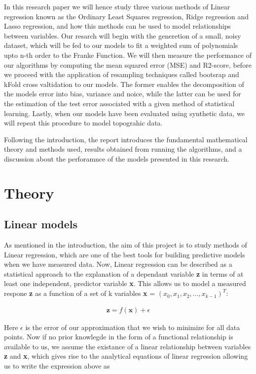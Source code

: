 \documentclass[a4paper, 10pt]{article}
\begin{document}
In this research paper we will hence study three various methods of Linear regression known as the Ordinary Least Squares regression, Ridge regression and Lasso regression, and how this methods can be used to model relationships between variables. Our resarch will begin with the generetion of a small, noisy dataset, which will be fed to our models to fit a weighted sum of polynomials upto n-th order to the Franke Function. We will then measure the performance of our algorithms by computing the mean squared error (MSE) and R2-score, before we proceed with the application of resampling techniques called bootsrap and kFold cross valtidation to our models. The former enables the decomposition of the models error into bias, variance and noice, while the latter can be used for the estimation of the test error associated with a given method of statistical learning. Lastly, when our models have been evaluated using synthetic data, we will repeat this procedure to model topograhic data.  

Following the introduction, the report introduces the fundamental mathematical theory and methods used, results obtained from running the algorithms, and a discussion about the perforamnce of the models presented in this research.   
\linespread{2.5}

\section{Theory}

\subsection{Linear models}
As mentioned in the introduction, the aim of this project is to study methods of Linear regression, which are one of the best tools for building predictive models when we have measured data. Now, Linear regression can be described as a statistical approach to the explanation of a dependant variable \textbf{z} in terms of at least one independent, predictor variable \textbf{x}. This allows us to model a measured respone \textbf{z} as a function of a set of k variables \textbf{x} = \emph{$(x_0, x_1, x_2, ... , x_{k-1})^T$}: 

\begin{gather*}
	\textbf{z} = f(\textbf{x}) + \epsilon
\end{gather*}

Here $\epsilon$ is the error of our approximation that we wish to minimize for all data points. Now if no prior knowlegde in the form of a functional relationship is available to us, we assume the existance of a linear relationship between variables \textbf{z} and \textbf{x}, which gives rise to the analytical equations of linear regression allowing us to write the expression above as
\end{document}
